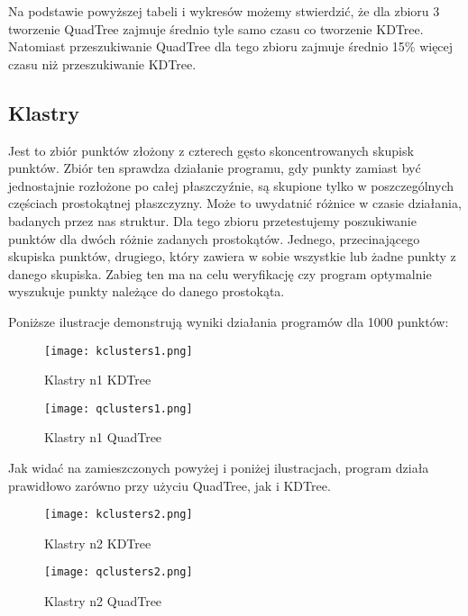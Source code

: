 \documentclass[a4paper, 12pt]{article}
\begin{document}
      \noindent
      \quad Na podstawie powyższej tabeli i wykresów możemy stwierdzić, że dla zbioru 3 tworzenie QuadTree zajmuje średnio tyle samo czasu co tworzenie KDTree. Natomiast przeszukiwanie QuadTree dla tego zbioru zajmuje średnio 15\% więcej czasu niż przeszukiwanie KDTree. 

    \subsection{Klastry}
      \quad Jest to zbiór punktów złożony z czterech gęsto skoncentrowanych skupisk punktów. Zbiór ten sprawdza działanie programu, gdy punkty zamiast być jednostajnie rozłożone po całej płaszczyźnie, są skupione tylko w poszczególnych częściach prostokątnej płaszczyzny. Może to uwydatnić różnice w czasie działania, badanych przez nas struktur. Dla tego zbioru przetestujemy poszukiwanie punktów dla dwóch różnie zadanych prostokątów. Jednego, przecinającego skupiska punktów, drugiego, który zawiera w sobie wszystkie lub żadne punkty z danego skupiska. Zabieg ten ma na celu weryfikację czy program optymalnie wyszukuje punkty należące do danego prostokąta.

      \noindent
      \quad Poniższe ilustracje demonstrują wyniki działania programów dla 1000 punktów:

      \newpage
      \begin{figure}[h!]
      \centering
        \texttt{[image: kclusters1.png]}
        \caption{Klastry n1 KDTree}
      \end{figure}

      \begin{figure}[h!]
      \centering
        \texttt{[image: qclusters1.png]}
        \caption{Klastry n1 QuadTree}
      \end{figure}

      \noindent
      \quad Jak widać na zamieszczonych powyżej i poniżej ilustracjach, program działa prawidłowo zarówno przy użyciu QuadTree, jak i KDTree.

      \newpage
      \begin{figure}[h!]
      \centering
        \texttt{[image: kclusters2.png]}
        \caption{Klastry n2 KDTree}
      \end{figure}

      \begin{figure}[h!]
      \centering
        \texttt{[image: qclusters2.png]}
        \caption{Klastry n2 QuadTree}
      \end{figure}
\end{document}
